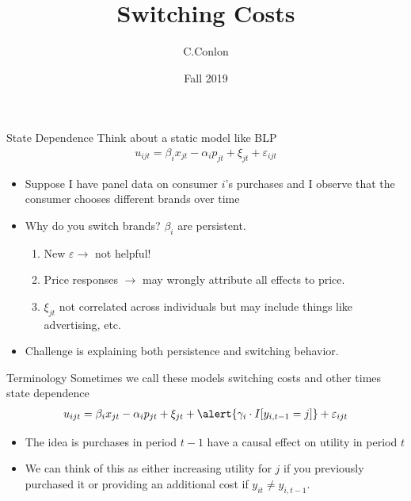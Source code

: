 \documentclass[xcolor=pdftex,dvipsnames,table,mathserif,aspectratio=169]{beamer}
\title [Dynamic Oligopoly I]{Switching Costs}
\author{C.Conlon }
\institute{Grad IO }
\date{Fall 2019}
\begin{document}
\begin{frame}
\titlepage
\end{frame}



\begin{frame}{State Dependence}
Think about a static model like BLP
\begin{eqnarray*}
u_{ijt} = \beta_i x_{jt} - \alpha_i p_{jt} + \xi_{jt} + \varepsilon_{ijt}
\end{eqnarray*}
\begin{itemize}
\item Suppose I have panel data on consumer $i$'s purchases and I observe that the consumer chooses different brands over time
\item Why do you switch brands?  $\beta_i$ are persistent.
\begin{enumerate}
\item New $\varepsilon \rightarrow$ not helpful!
\item Price responses $\rightarrow$ may wrongly attribute all effects to price.
\item $\xi_{jt}$ not correlated across individuals but may include things like advertising, etc.
\end{enumerate}
\item Challenge is explaining both \alert{persistence} and \alert{switching} behavior.
\end{itemize}
\end{frame} 



\begin{frame}{Terminology}
Sometimes we call these models \alert{switching costs} and other times \alert{state dependence}
\begin{eqnarray*}
u_{ijt} = \beta_i x_{jt} - \alpha_i p_{jt} + \xi_{jt} + \alert{\gamma_i \cdot I[y_{i,t-1}=j]} + \varepsilon_{ijt} 
\end{eqnarray*}
\begin{itemize}
\item The idea is purchases in period $t-1$ have a causal effect on utility in period $t$
\item We can think of this as either increasing utility for $j$ if you previously purchased it or providing an additional cost if $y_{it} \neq y_{i,t-1}$.
\end{itemize}
\end{frame} 
\end{document}
